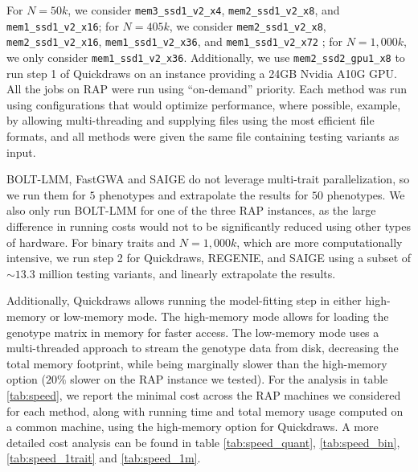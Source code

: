 \sloppy
For $N = 50k$, we consider \texttt{mem3\_ssd1\_v2\_x4}, \texttt{mem2\_ssd1\_v2\_x8}, and \texttt{mem1\_ssd1\_v2\_x16}; for $N = 405k$, we consider \texttt{mem2\_ssd1\_v2\_x8}, \texttt{mem2\_ssd1\_v2\_x16}, \texttt{mem1\_ssd1\_v2\_x36}, and \texttt{mem1\_ssd1\_v2\_x72}
\sloppy
%
; for $N = 1{,}000k$, we only consider \texttt{mem1\_ssd1\_v2\_x36}.
Additionally, we use \texttt{mem2\_ssd2\_gpu1\_x8} to run step 1 of Quickdraws on an instance providing a 24GB Nvidia A10G GPU.
%
All the jobs on RAP were run using ``on-demand'' priority.
%
Each method was run using configurations that would optimize performance, where possible, example, by allowing multi-threading and supplying files using the most efficient file formats, and all methods were given the same file containing testing variants as input.

BOLT-LMM, FastGWA and SAIGE do not leverage multi-trait parallelization, so we run them for $5$ phenotypes and extrapolate the results for $50$ phenotypes.
%
We also only run BOLT-LMM for one of the three RAP instances, as the large difference in running costs would not to be significantly reduced using other types of hardware.
%
For binary traits and $N = 1{,}000k$, which are more computationally intensive, we run step 2 for Quickdraws, REGENIE, and SAIGE using a subset of ${\sim}13.3$ million testing variants, and linearly extrapolate the results.

%
Additionally, Quickdraws allows running the model-fitting step in either high-memory or low-memory mode.
%
The high-memory mode allows for loading the genotype matrix in memory for faster access.
%
The low-memory mode uses a multi-threaded approach to stream the genotype data from disk, decreasing the total memory footprint, while being marginally slower than the high-memory option ($20\%$ slower on the RAP instance we tested).
%
For the analysis in table \ref{tab:speed}, we report the minimal cost across the RAP machines we considered for each method, along with running time and total memory usage computed on a common machine, using the high-memory option for Quickdraws. A more detailed cost analysis can be found in table \ref{tab:speed_quant}, \ref{tab:speed_bin}, \ref{tab:speed_1trait} and \ref{tab:speed_1m}.

